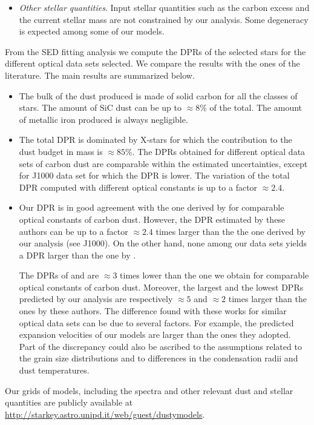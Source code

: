 \documentclass[useAMS,usenatbib]{mn2e/mn2e}
\begin{document}
{\begin{itemize}
\item \textit{Other stellar quantities}. Input stellar quantities such as the carbon excess and the current stellar mass are not constrained by our analysis. Some degeneracy is expected among some of our models.
\end{itemize}

From the SED fitting analysis we compute the DPRs of the selected stars for the different optical data sets selected. We compare the results with the ones of the literature.
The main results are summarized below.
\begin{itemize}
\item The bulk of the dust produced is made of solid carbon for all the classes of stars. 
The amount of SiC dust can be up to $\approx8\%$ of the total. 
The amount of metallic iron produced is always negligible.
\item The total DPR is dominated by X-stars for which the contribution to the dust budget in mass is $\approx85\%$.
The DPRs obtained for different optical data sets of carbon dust are comparable within the estimated uncertainties, except for J1000 data set for which the DPR is lower. The variation of the total DPR computed with different optical constants is up to a factor $\approx2.4$.
\item Our DPR is in good agreement with the one derived by \citet{Matsuura13} for comparable optical constants of carbon dust.
However, the DPR estimated by these authors can be up to a factor $\approx2.4$ times larger than the 
the one derived by our analysis (see J1000). On the other hand, none among our data sets yields a DPR larger than the one by \citet{Matsuura13}.

The DPRs of \citet{Boyer12} and \citet{Srinivasan16} are $\approx 3$ times lower than the one we obtain for comparable optical constants of carbon dust.
Moreover, the largest and the lowest DPRs predicted by our analysis are respectively $\approx5$ and $\approx 2$ times larger than the ones by these authors. The difference found with these works for similar optical data sets can be due to several factors. For example, the predicted expansion velocities of our models are larger than the ones they adopted. Part of the discrepancy could also be ascribed to the assumptions related to the grain size distributions and to differences in the condensation radii and dust temperatures.
\end{itemize}

Our grids of models, including the spectra and other relevant dust and stellar quantities are publicly available at \url{http://starkey.astro.unipd.it/web/guest/dustymodels}.  

}
\end{document}
